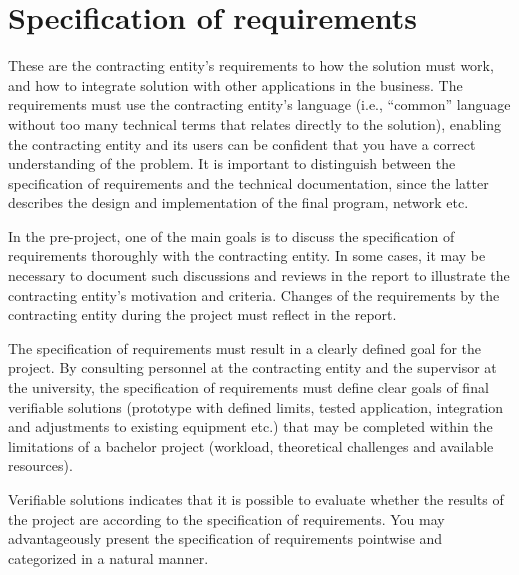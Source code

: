 \section{Specification of requirements}
These are the contracting entity’s requirements to how the solution must work, and how to integrate solution with other applications in the business. The requirements must use the contracting entity’s language (i.e., “common” language without too many technical terms that relates directly to the solution), enabling the contracting entity and its users can be confident that you have a correct understanding of the problem. It is important to distinguish between the specification of requirements and the technical documentation, since the latter describes the design and implementation of the final program, network etc. 

In the pre-project, one of the main goals is to discuss the specification of requirements thoroughly with the contracting entity. In some cases, it may be necessary to document such discussions and reviews in the report to illustrate the contracting entity’s motivation and criteria. Changes of the requirements by the contracting entity during the project must reflect in the report. 

The specification of requirements must result in a clearly defined goal for the project. By consulting personnel at the contracting entity and the supervisor at the university, the specification of requirements must define clear goals of final verifiable solutions (prototype with defined limits, tested application, integration and adjustments to existing equipment etc.) that may be completed within the limitations of a bachelor project (workload, theoretical challenges and available resources).

Verifiable solutions indicates that it is possible to evaluate whether the results of the project are according to the specification of requirements. You may advantageously present the specification of requirements pointwise and categorized in a natural manner.

\pagebreak